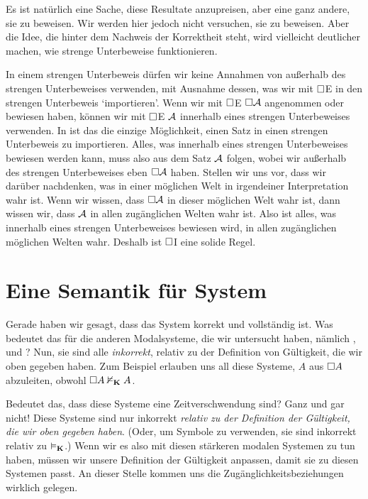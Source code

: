 Es ist natürlich eine Sache, diese Resultate anzupreisen, aber eine ganz andere, sie zu beweisen. Wir werden hier jedoch nicht versuchen, sie zu beweisen. Aber die Idee, die hinter dem Nachweis der Korrektheit steht, wird vielleicht deutlicher machen, wie strenge Unterbeweise funktionieren. 

In einem strengen Unterbeweis dürfen wir keine Annahmen von außerhalb des strengen Unterbeweises verwenden, mit Ausnahme dessen, was wir mit $\Box$E in den strengen Unterbeweis `importieren'. Wenn wir mit $\Box$E $\Box \mathcal{A}$ angenommen oder bewiesen haben, können wir mit $\Box$E $\mathcal{A}$ innerhalb eines strengen Unterbeweises verwenden. In \mlK ist das die einzige Möglichkeit, einen Satz in einen strengen Unterbeweis zu importieren. Alles, was innerhalb eines strengen Unterbeweises bewiesen werden kann, muss also aus dem Satz $\mathcal{A}$ folgen, wobei wir außerhalb des strengen Unterbeweises eben $\Box \mathcal{A}$ haben. Stellen wir uns vor, dass wir darüber nachdenken, was in einer möglichen Welt in irgendeiner Interpretation wahr ist. Wenn wir wissen, dass $\Box\mathcal{A}$ in dieser möglichen Welt wahr ist, dann wissen wir, dass $\mathcal{A}$ in allen zugänglichen Welten wahr ist. Also ist alles, was innerhalb eines strengen Unterbeweises bewiesen wird, in allen zugänglichen möglichen Welten wahr. Deshalb ist $\Box$I eine solide Regel.

\section{Eine Semantik für System \mlT}
\label{SemanticsT}

Gerade haben wir gesagt, dass das System \mlK{} korrekt und vollständig ist. Was bedeutet das für die anderen Modalsysteme, die wir untersucht haben, nämlich \mlT, \mlSfour{} und \mlSfive? Nun, sie sind alle \emph{inkorrekt}, relativ zu der Definition von Gültigkeit, die wir oben gegeben haben. Zum Beispiel erlauben uns all diese Systeme, $A$ aus $\Box A$ abzuleiten, obwohl $\Box A \nvDash_{\mathbf{K}} A$.

Bedeutet das, dass diese Systeme eine Zeitverschwendung sind? Ganz und gar nicht! Diese Systeme sind nur inkorrekt \emph{relativ zu der Definition der Gültigkeit, die wir oben gegeben haben}. (Oder, um Symbole zu verwenden, sie sind inkorrekt relativ zu $\vDash_{\mathbf{K}}$.) Wenn wir es also mit diesen stärkeren modalen Systemen zu tun haben, müssen wir unsere Definition der Gültigkeit anpassen, damit sie zu diesen Systemen passt. An dieser Stelle kommen uns die Zugänglichkeitsbeziehungen wirklich gelegen.

